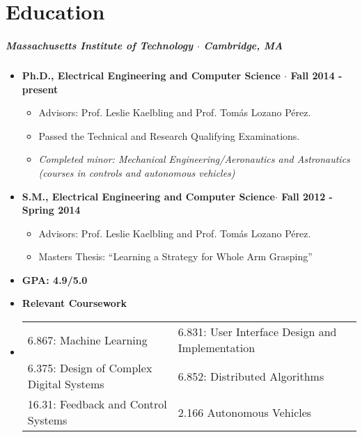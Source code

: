 \documentclass[10pt,letterpaper]{article}
\begin{document}
\section*{Education}
 \subparagraph{Massachusetts Institute of Technology $\cdot$ Cambridge, MA}

\begin{itemize}
    \item {\bf Ph.D., Electrical Engineering and Computer Science $\cdot$ Fall 2014 - present}
 	\begin{itemize}
        \item Advisors: Prof. Leslie Kaelbling and Prof. Tom\'as Lozano P\'erez.
        \item Passed the Technical and Research Qualifying Examinations.
        \item {\em Completed minor: Mechanical Engineering/Aeronautics and Astronautics\\
                (courses in controls and autonomous vehicles)}
	\end{itemize}
\end{itemize}

\begin{itemize}
 	\item {\bf S.M., Electrical Engineering and Computer Science$\cdot$ Fall 2012 - Spring 2014}
    \begin{itemize}
	    \item Advisors: Prof. Leslie Kaelbling and Prof. Tom\'as Lozano P\'erez.
	    \item Masters Thesis: ``Learning a Strategy for Whole Arm Grasping''
	\end{itemize}
\end{itemize}

\begin{itemize}
    \item {\bf GPA:  4.9/5.0 }
	\item {\bf Relevant Coursework}
    \item
    \begin{tabularx}{\textwidth}{l l}
      6.867: Machine Learning 
      & \hfill 6.831: User Interface Design and Implementation\\
      6.375: Design of Complex Digital Systems
      & \hfill 6.852: Distributed Algorithms\\
      16.31: Feedback and Control Systems
      & \hfill 2.166 Autonomous Vehicles\\
     \end{tabularx}
\end{itemize}
\end{document}

